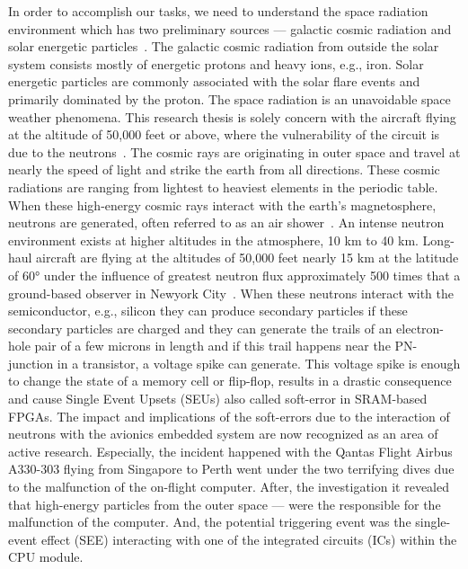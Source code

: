 In order to accomplish our tasks, we need to understand the space radiation environment which has two preliminary sources --- galactic cosmic radiation and solar energetic particles~\cite{SWE20216}. The galactic cosmic radiation from outside the solar system consists mostly of energetic protons and heavy ions, e.g., iron. Solar energetic particles are commonly associated with the solar flare events and primarily dominated by the proton.  The space radiation is an unavoidable space weather phenomena. This research thesis is solely concern with the aircraft flying at the altitude of 50,000 feet or above, where the vulnerability of the circuit is due to the neutrons~\cite{xilinnseu}. The cosmic rays are originating in outer space and travel at nearly the speed of light and strike the earth from all directions. These cosmic radiations are ranging from lightest to heaviest elements in the periodic table. When these high-energy cosmic rays interact with the earth's magnetosphere, neutrons are generated, often referred to as an air shower~\cite{lesea2005rosetta}.  An intense neutron environment exists at higher altitudes in the atmosphere, 10 km to 40 km.  Long-haul aircraft are flying at the altitudes of 50,000 feet nearly 15 km at the latitude of \ang{60} under the influence of greatest neutron flux approximately 500 times that a ground-based observer in Newyork City~\cite{lesea2005rosetta}. When these neutrons interact with the semiconductor, e.g., silicon they can produce secondary particles if these secondary particles are charged and they can generate the trails of an electron-hole pair of a few microns in length and if this trail happens near the PN-junction in a transistor, a voltage spike can generate. This voltage spike is enough to change the state of a memory cell or flip-flop, results in a drastic consequence and cause Single Event Upsets (SEUs) also called soft-error in SRAM-based FPGAs. The impact and implications of the soft-errors due to the interaction of neutrons with the avionics embedded system are now recognized as an area of active research. Especially, the incident happened with the Qantas Flight Airbus A330-303 flying from Singapore to Perth went under the two terrifying dives due to the malfunction of the on-flight computer. After, the investigation it revealed that high-energy particles from the outer space --- were the responsible for the malfunction of the computer. And, the potential triggering event was the single-event effect (SEE) interacting with one of the integrated circuits (ICs) within the CPU module. 




